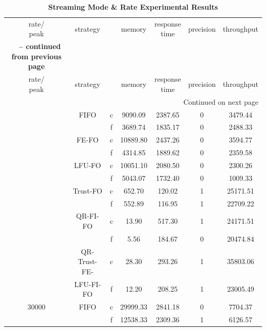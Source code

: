 \begin{center}
	\begin{longtable}{|c||c||c|c|c|c|c|}
	\caption{\textbf{Streaming Mode \& Rate Experimental Results}} \label{tab:6-smri} \\
	\hline \makecell{rate/ \\ peak} & strategy & \makecell{mode} & memory & \makecell{response \\time} & precision & throughput \\ \hhline{|=#=#=|=|=|=|=|}
	\endfirsthead
	\multicolumn{7}{c} {{\bfseries \tablename\ \thetable{} -- continued from previous page}} \\
	\hline \makecell{rate/ \\ peak} & strategy & \makecell{mode} & memory & \makecell{response \\time} & precision & throughput \\ \hline 
	\endhead
	\hline \multicolumn{7}{|r|}{{Continued on next page}} \\ \hline
	\endfoot
	\hline
	\endlastfoot
	10000 & FIFO & c  & 9090.09 & 2387.65 & 0 & 3479.44 \\ \cline{3-7}
	      &      & f  & 3689.74 & 1835.17 & 0 & 2488.33 \\ \cline{2-7}
	      & FE-FO & c & 10889.80 & 2437.26 & 0 & 3594.77\\ \cline{3-7}
	      &       & f & 4314.85  & 1889.62 & 0 & 2359.58\\ \cline{2-7}
	      & LFU-FO & c & 10051.10 & 2080.50 & 0 & 2300.26 \\ \cline{3-7}
	      &        & f & 5043.07  & 1732.40 & 0 & 1009.33\\  \cline{2-7}
	      & Trust-FO & c & 652.70 & 120.02 & 1 & 25171.51\\  \cline{3-7}
	      &          & f & 552.89 & 116.95 & 1 & 22709.22\\  \cline{2-7}
	      & QR-FI-FO & c & 13.90 & 517.30 & 1 & 24171.51\\ \cline{3-7}
	      &          & f & 5.56  & 184.67 & 0 & 20474.84\\  \cline{2-7}
	      & QR-Trust-FE- & c & 28.30 & 293.26 & 1 & 35803.06\\  \cline{3-7}
	      & LFU-FI-FO    & f & 12.20 & 208.25 & 1 & 23005.49\\ \hhline{|=#=#=|=|=|=|=|}
	30000 & FIFO & c & 29999.33 & 2841.18 & 0 & 7704.37 \\     \cline{3-7}
	      &      & f & 12538.33 & 2309.36 & 1 & 6126.57 \\ \cline{2-7}

\end{longtable}
\end{center}
